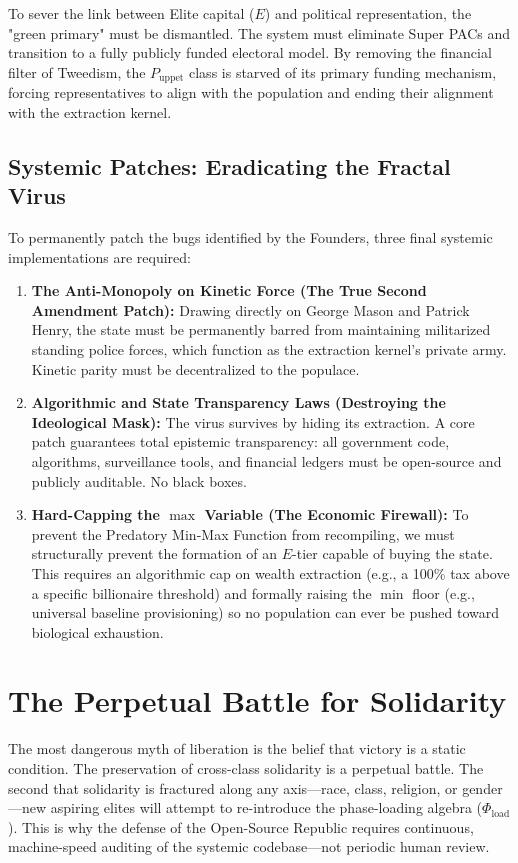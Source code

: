 To sever the link between Elite capital ($E$) and political representation, the "green primary" must be dismantled. The system must eliminate Super PACs and transition to a fully publicly funded electoral model. By removing the financial filter of Tweedism, the $P_{\text{uppet}}$ class is starved of its primary funding mechanism, forcing representatives to align with the population and ending their alignment with the extraction kernel.

\subsection{Systemic Patches: Eradicating the Fractal Virus}

To permanently patch the bugs identified by the Founders, three final systemic implementations are required:

\begin{enumerate}
    \item \textbf{The Anti-Monopoly on Kinetic Force (The True Second Amendment Patch):} Drawing directly on George Mason and Patrick Henry, the state must be permanently barred from maintaining militarized standing police forces, which function as the extraction kernel's private army. Kinetic parity must be decentralized to the populace.
    \item \textbf{Algorithmic and State Transparency Laws (Destroying the Ideological Mask):} The virus survives by hiding its extraction. A core patch guarantees total epistemic transparency: all government code, algorithms, surveillance tools, and financial ledgers must be open-source and publicly auditable. No black boxes.
    \item \textbf{Hard-Capping the $\max$ Variable (The Economic Firewall):} To prevent the Predatory Min-Max Function from recompiling, we must structurally prevent the formation of an $E$-tier capable of buying the state. This requires an algorithmic cap on wealth extraction (e.g., a 100\% tax above a specific billionaire threshold) and formally raising the $\min$ floor (e.g., universal baseline provisioning) so no population can ever be pushed toward biological exhaustion.
\end{enumerate}

\section{The Perpetual Battle for Solidarity}

The most dangerous myth of liberation is the belief that victory is a static condition. The preservation of cross-class solidarity is a perpetual battle. The second that solidarity is fractured along any axis---race, class, religion, or gender---new aspiring elites will attempt to re-introduce the phase-loading algebra ($\Phi_{\text{load}}$). This is why the defense of the Open-Source Republic requires continuous, machine-speed auditing of the systemic codebase---not periodic human review.

